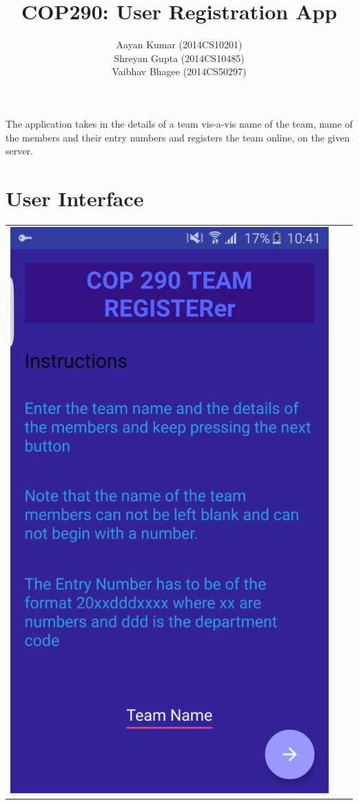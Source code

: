 \documentclass[12pt]{article}
\title{COP290: User Registration App}
\author{Aayan Kumar (2014CS10201) \\ Shreyan Gupta (2014CS10485) \\ Vaibhav Bhagee (2014CS50297) }
\begin{document}
\maketitle

The application takes in the details of a team vis-a-vis name of the team, name of the members and their entry numbers and registers the team online, on the given server.

\section{User Interface}

\begin{center}
\begin{tabular}{c c c}
     
\begin{minipage}[t]{.3\textwidth}
\includegraphics[width=\textwidth]{./Intro_Page}

\end{minipage}
\end{tabular}
\end{center}
\end{document}

